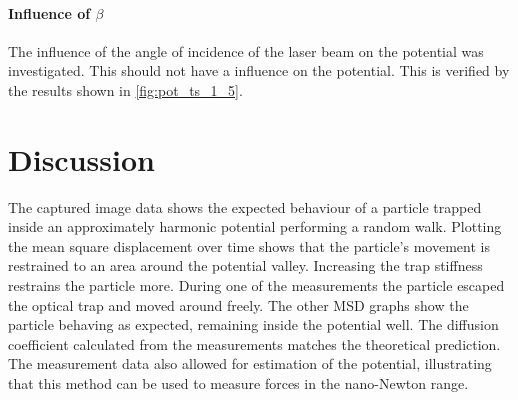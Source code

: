 \documentclass[
    twoside=false,
    twocolumn=true,
    fontsize=11pt,
]{scrarticle}
\begin{document}
\paragraph{Influence of $\beta$}
The influence of the angle of incidence of the laser beam on the potential was investigated.
This should not have a influence on the potential.
This is verified by the results shown in \autoref{fig:pot_ts_1_5}.

\pagebreak
\section{Discussion}
The captured image data shows the expected behaviour of a particle trapped inside an approximately harmonic potential performing a random walk. Plotting the mean square displacement over time shows that the particle's movement is restrained to an area around the potential valley. Increasing the trap stiffness restrains the particle more. During one of the measurements the particle escaped the optical trap and moved around freely. The other MSD graphs show the particle behaving as expected, remaining inside the potential well. The diffusion coefficient calculated from the measurements matches the theoretical prediction. The measurement data also allowed for estimation of the potential, illustrating that this method can be used to measure forces in the nano-Newton range.\\
\end{document}
